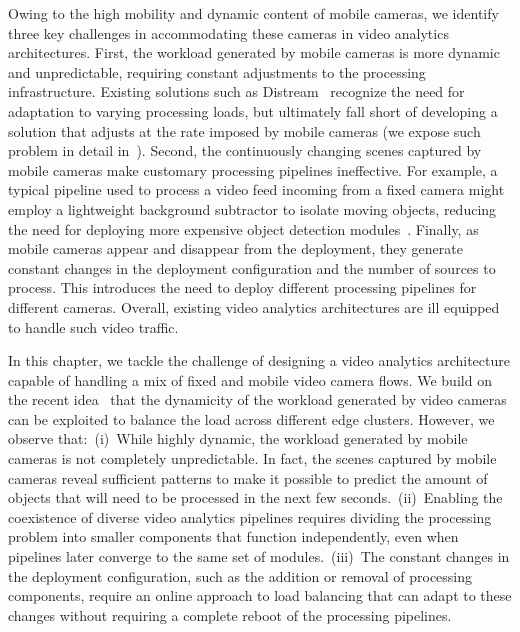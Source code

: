 Owing to the high mobility and dynamic content of mobile cameras, we identify three key challenges in accommodating these cameras in video analytics architectures. First, the workload generated by mobile cameras is more dynamic and unpredictable, requiring constant adjustments to the processing infrastructure. Existing solutions such as Distream~\cite{zeng2020distream} recognize the need for adaptation to varying processing loads, but ultimately fall short of developing a solution that adjusts at the rate imposed by mobile cameras (we expose such problem in detail in~). Second, the continuously changing scenes captured by mobile cameras make customary processing pipelines ineffective. For example, a typical pipeline used to process a video feed incoming from a fixed camera might employ a lightweight background subtractor to isolate moving objects, reducing the need for deploying more expensive object detection modules~\cite{zeng2020distream}. Finally, as mobile cameras appear and disappear from the deployment, they generate constant changes in the deployment configuration and the number of sources to process. This introduces the need to deploy different processing pipelines for different cameras. Overall, existing video analytics architectures are ill equipped to handle such video traffic.

In this chapter, we tackle the challenge of designing a video analytics architecture capable of handling a mix of fixed and mobile video camera flows. We build on the recent idea~\cite{zeng2020distream} that the dynamicity of the workload generated by video cameras can be exploited to balance the load across different edge clusters. However, we observe that:~(i)~While highly dynamic, the workload generated by mobile cameras is not completely unpredictable. In fact, the scenes captured by mobile cameras reveal sufficient patterns to make it possible to predict the amount of objects that will need to be processed in the next few seconds.~(ii)~Enabling the coexistence of diverse video analytics pipelines requires dividing the processing problem into smaller components that function independently, even when pipelines later converge to the same set of modules.~(iii)~The constant changes in the deployment configuration, such as the addition or removal of processing components, require an online approach to load balancing that can adapt to these changes without requiring a complete reboot of the processing pipelines.

